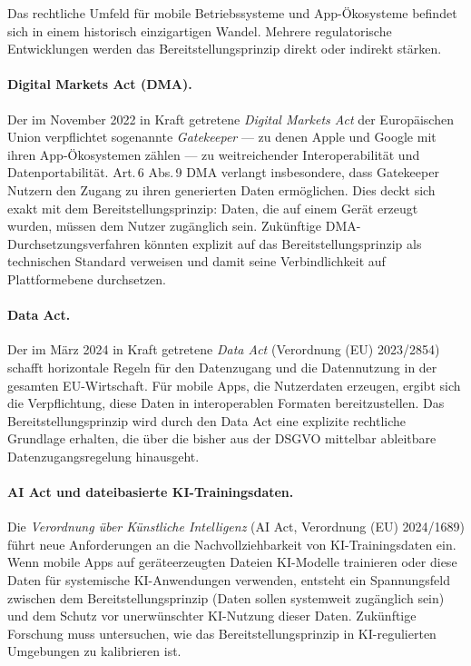 ﻿\documentclass[12pt, a4paper]{article}
\begin{document}
Das rechtliche Umfeld für mobile Betriebssysteme und App-Öko\-sys\-te\-me befindet sich
in einem historisch einzigartigen Wandel. Mehrere regulatorische Entwicklungen werden
das Bereitstellungsprinzip direkt oder indirekt stärken.

\paragraph{Digital Markets Act (DMA).}
Der im November 2022 in Kraft getretene \emph{Digital Markets Act} der Europäischen Union
verpflichtet sogenannte \emph{Gatekeeper} --- zu denen Apple und Google mit ihren
App-Ökosystemen zählen --- zu weitreichender Interoperabilität und Datenportabilität.
Art.\,6 Abs.\,9 DMA verlangt insbesondere, dass Gatekeeper Nutzern den Zugang zu ihren
generierten Daten ermöglichen. Dies deckt sich exakt mit dem Bereitstellungsprinzip:
Daten, die auf einem Gerät erzeugt wurden, müssen dem Nutzer zugänglich sein. Zukünftige
DMA-Durchsetzungsverfahren könnten explizit auf das Bereitstellungsprinzip als technischen
Standard verweisen und damit seine Verbindlichkeit auf Plattformebene durchsetzen.

\paragraph{Data Act.}
Der im März 2024 in Kraft getretene \emph{Data Act} (Verordnung (EU) 2023/2854) schafft
horizontale Regeln für den Datenzugang und die Datennutzung in der gesamten EU-Wirtschaft.
Für mobile Apps, die Nutzerdaten erzeugen, ergibt sich die Verpflichtung, diese Daten in
interoperablen Formaten bereitzustellen. Das Bereitstellungsprinzip wird durch den Data Act
eine explizite rechtliche Grundlage erhalten, die über die bisher aus der DSGVO mittelbar
ableitbare Datenzugangsregelung hinausgeht.

\paragraph{AI Act und dateibasierte KI-Trainingsdaten.}
Die \emph{Verordnung über Künstliche Intelligenz} (AI Act, Verordnung (EU) 2024/1689)
führt neue Anforderungen an die Nachvollziehbarkeit von KI-Trainingsdaten ein. Wenn
mobile Apps auf geräteerzeugten Dateien KI-Modelle trainieren oder diese Daten für
systemische KI-Anwendungen verwenden, entsteht ein Spannungsfeld zwischen dem
Bereitstellungsprinzip (Daten sollen systemweit zugänglich sein) und dem Schutz vor
unerwünschter KI-Nutzung dieser Daten. Zukünftige Forschung muss untersuchen, wie das
Bereitstellungsprinzip in KI-regulierten Umgebungen zu kalibrieren ist.
\end{document}
